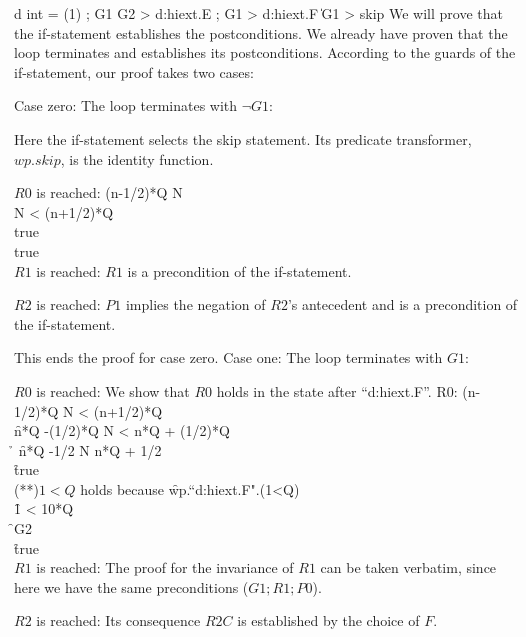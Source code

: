 \bblock
   d \vir int \array \:= (1) 
 ; \do G1 \mand G2 \-> d:hiext.E  \od
 ; \IF G1 \-> d:hiext.F  \| \neg G1 \-> skip\FI
\eblock
We will prove that the if-statement establishes the postconditions.
We already have proven that the loop terminates and establishes
its postconditions. According to the guards of the if-statement,
our proof takes two cases:

Case zero: The loop terminates with $\neg G1$: 

Here the if-statement selects the skip statement. Its predicate
transformer, $wp.skip$, is the identity function.

$R0$ is reached:
\df   (n-1/2)*Q \le N \\      N < (n+1/2)*Q \\
\dh{}        
\df   true	\\	      true \\

$R1$ is reached: $R1$ is a precondition of the if-statement.

$R2$ is reached: $P1$ implies the negation of $R2$'s antecedent
and is a precondition of the if-statement.
 
This ends the proof for case zero.
\filbreak
Case one: The loop terminates with $G1$:

$R0$ is reached: We show that $R0$ holds in the state after
``d:hiext.F''.
\nf R0: (n-1/2)*Q \le N < (n+1/2)*Q\\
\f n*Q -(1/2)*Q \le N < n*Q + (1/2)*Q\\
\h {}
\f n*Q -1/2 \le N \le  n*Q + 1/2\\
\f true\\

(**)$1<Q$ holds because
\f wp.``d:hiext.F".(1<Q)\\
\f 1 < 10*Q\\
\f \neg G2\\
\f true\\

$R1$ is reached: The proof for the invariance of $R1$ can be taken
verbatim, since here we have the same preconditions ($G1; R1; P0$).

$R2$ is reached: Its consequence $R2C$ is established by the choice of $F$.


